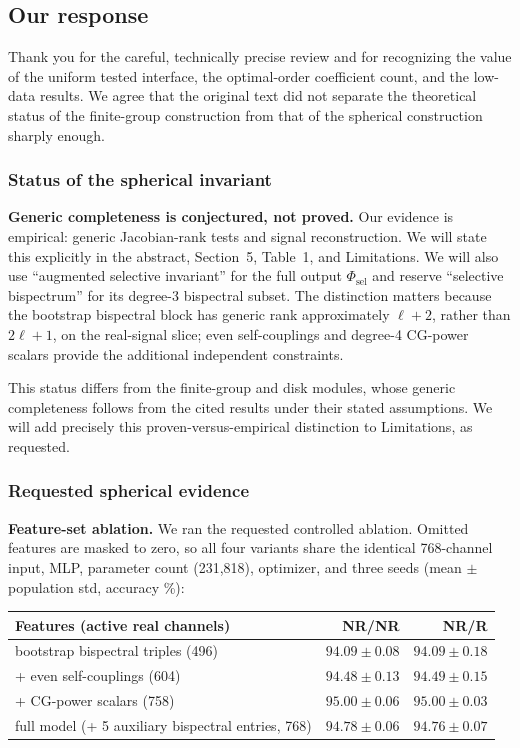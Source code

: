 \documentclass[10pt]{article}
\begin{document}
\subsection{Our response}

Thank you for the careful, technically precise review and for recognizing the
value of the uniform tested interface, the optimal-order coefficient count,
and the low-data results. We agree that the original text did not separate
the theoretical status of the finite-group construction from that of the
spherical construction sharply enough.

\subsubsection*{Status of the spherical invariant}

\textbf{Generic completeness is conjectured, not proved.} Our evidence is
empirical: generic Jacobian-rank tests and signal reconstruction. We will
state this explicitly in the abstract, Section~5, Table~1, and Limitations.
We will also use ``augmented selective invariant'' for the full output
$\Phi_{\mathrm{sel}}$ and reserve ``selective bispectrum'' for its degree-3
bispectral subset. The distinction matters because the bootstrap bispectral
block has generic rank approximately $\ell+2$, rather than $2\ell+1$, on the
real-signal slice; even self-couplings and degree-4 CG-power scalars provide
the additional independent constraints.

This status differs from the finite-group and disk modules, whose generic
completeness follows from the cited results under their stated assumptions.
We will add precisely this proven-versus-empirical distinction to
Limitations, as requested.

\subsubsection*{Requested spherical evidence}

\textbf{Feature-set ablation.} We ran the requested controlled ablation.
Omitted features are masked to zero, so all four variants share the identical
768-channel input, MLP, parameter count (231{,}818), optimizer, and three
seeds (mean $\pm$ population std, accuracy \%):

\begin{center}
\begin{tabular}{lrr}
\toprule
Features (active real channels) & NR/NR & NR/R \\
\midrule
bootstrap bispectral triples (496)                & $94.09 \pm 0.08$ & $94.09 \pm 0.18$ \\
+ even self-couplings (604)                       & $94.48 \pm 0.13$ & $94.49 \pm 0.15$ \\
+ CG-power scalars (758)                          & $95.00 \pm 0.06$ & $95.00 \pm 0.03$ \\
full model (+ 5 auxiliary bispectral entries, 768) & $94.78 \pm 0.06$ & $94.76 \pm 0.07$ \\
\bottomrule
\end{tabular}
\end{center}
\end{document}
